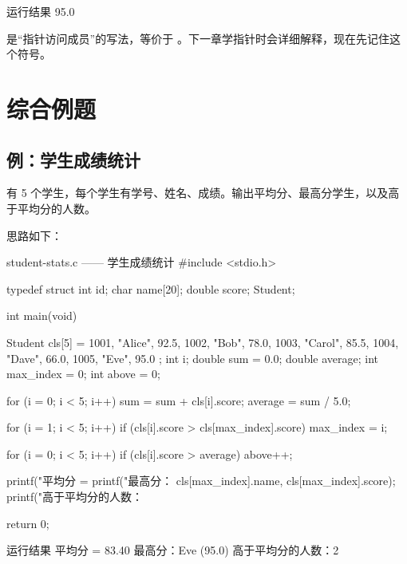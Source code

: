 \begin{outbox}{运行结果}
95.0
\end{outbox}

 是“指针访问成员”的写法，等价于 。下一章学指针时会详细解释，现在先记住这个符号。

\section{综合例题}

\subsection{例：学生成绩统计}

\begin{example}
有 5 个学生，每个学生有学号、姓名、成绩。输出平均分、最高分学生，以及高于平均分的人数。
\end{example}
\begin{solution}
思路如下：

\begin{codebox}{student-stats.c —— 学生成绩统计}
#include <stdio.h>

typedef struct {
    int id;
    char name[20];
    double score;
} Student;

int main(void)
{
    Student cls[5] = {
        {1001, "Alice", 92.5},
        {1002, "Bob",   78.0},
        {1003, "Carol", 85.5},
        {1004, "Dave",  66.0},
        {1005, "Eve",   95.0}
    };
    int i;
    double sum = 0.0;
    double average;
    int max_index = 0;
    int above = 0;

    for (i = 0; i < 5; i++) {
        sum = sum + cls[i].score;
    }
    average = sum / 5.0;

    for (i = 1; i < 5; i++) {
        if (cls[i].score > cls[max_index].score) {
            max_index = i;
        }
    }

    for (i = 0; i < 5; i++) {
        if (cls[i].score > average) {
            above++;
        }
    }

    printf("平均分 = %
    printf("最高分：%
           cls[max_index].name, cls[max_index].score);
    printf("高于平均分的人数：%

    return 0;
}
\end{codebox}

\begin{outbox}{运行结果}
平均分 = 83.40
最高分：Eve (95.0)
高于平均分的人数：2
\end{outbox}
\end{solution}

